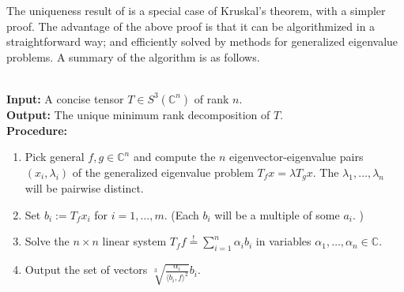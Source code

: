 The uniqueness result of is a special case of Kruskal's theorem, with a simpler proof. The advantage of the above proof is that it can be algorithmized in a straightforward way; and efficiently solved by methods for generalized eigenvalue problems.
A summary of the algorithm is as follows. 
\pagebreak
\begin{theorem}
	\hfill\\
	\textbf{Input: } A concise tensor $ T\in S^3(\mathbb C^n) $ of rank $ n $. \\
	\textbf{Output: } The unique minimum rank decomposition of $ T $. \\
	\textbf{Procedure: } \\
	\begin{enumerate}
		\item Pick general $ f, g\in \mathbb{C}^n $ and compute the $ n $ eigenvector-eigenvalue pairs $ (x_i, \lambda_i) $ of the generalized eigenvalue problem $ T_{f}x = \lambda T_{g}x $. The $ \lambda_1,\ldots,\lambda_n $ will be pairwise distinct. 
		\item Set $ b_i := T_fx_i $ for $ i = 1,\ldots,m $.	(Each $ b_i $ will be a multiple of some $ a_i $. )
		\item Solve the $ n\times n $ linear system $ T_f f \stackrel{!}{=} \sum_{i = 1}^{n} \alpha_i b_i $ in variables $ \alpha_1,\ldots,\alpha_n\in \mathbb{C} $. 
		\item Output the set of vectors $ \sqrt[3]{\frac{\alpha_i}{\langle b_i, f \rangle^2}} b_i $. 
	\end{enumerate}
\end{theorem}
